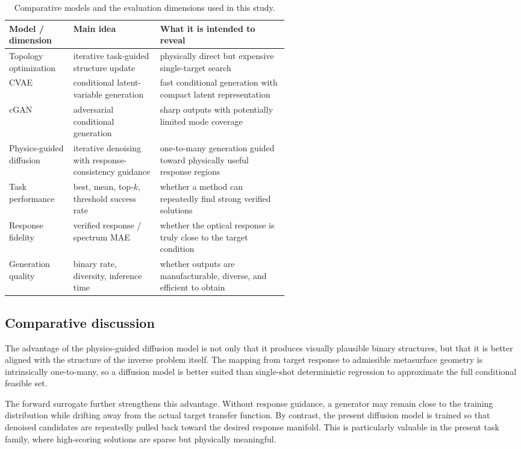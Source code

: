 \documentclass[10pt,a4paper]{article}
\begin{document}
\begin{table}[!htbp]
\centering
\caption{Comparative models and the evaluation dimensions used in this study.}
\begin{tabularx}{\linewidth}{>{\raggedright\arraybackslash}p{0.23\linewidth}>{\raggedright\arraybackslash}p{0.31\linewidth}X}
\toprule
Model / dimension & Main idea & What it is intended to reveal \\
\midrule
Topology optimization & iterative task-guided structure update & physically direct but expensive single-target search \\
CVAE & conditional latent-variable generation & fast conditional generation with compact latent representation \\
cGAN & adversarial conditional generation & sharp outputs with potentially limited mode coverage \\
Physics-guided diffusion & iterative denoising with response-consistency guidance & one-to-many generation guided toward physically useful response regions \\
\midrule
Task performance & best, mean, top-$k$, threshold success rate & whether a method can repeatedly find strong verified solutions \\
Response fidelity & verified response / spectrum MAE & whether the optical response is truly close to the target condition \\
Generation quality & binary rate, diversity, inference time & whether outputs are manufacturable, diverse, and efficient to obtain \\
\bottomrule
\end{tabularx}
\end{table}

\subsection{Comparative discussion}

The advantage of the physics-guided diffusion model is not only that it produces visually plausible binary structures, but that it is better aligned with the structure of the inverse problem itself. The mapping from target response to admissible metasurface geometry is intrinsically one-to-many, so a diffusion model is better suited than single-shot deterministic regression to approximate the full conditional feasible set.

The forward surrogate further strengthens this advantage. Without response guidance, a generator may remain close to the training distribution while drifting away from the actual target transfer function. By contrast, the present diffusion model is trained so that denoised candidates are repeatedly pulled back toward the desired response manifold. This is particularly valuable in the present task family, where high-scoring solutions are sparse but physically meaningful.
\end{document}
